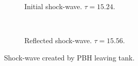 \begin{figure}
\centering
\begin{subfigure}{\textwidth}

\caption{Initial shock-wave. $\tau  = 15.24$.}
\end{subfigure} \\
\begin{subfigure}{\textwidth}

\caption{Reflected shock-wave. $\tau = 15.56$.}
\end{subfigure}
\caption{Shock-wave created by PBH leaving tank.}
\label{fig:shock}
\end{figure}

%
